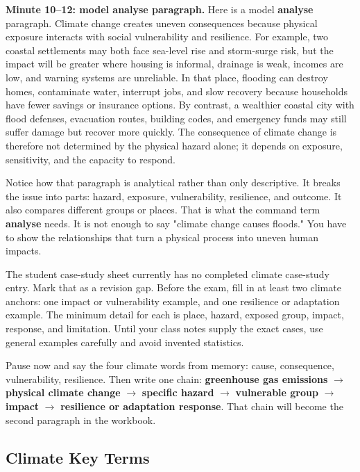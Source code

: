 \documentclass[11pt,a4paper]{article}
\newcommand{\term}[1]{\textcolor{HeadingBlue}{\textbf{#1}}}
\newcommand{\exam}[1]{\textcolor{AccentTeal}{\textbf{#1}}}
\begin{document}
\textbf{Minute 10--12: model analyse paragraph.}
Here is a model \exam{analyse} paragraph. Climate change creates uneven
consequences because physical exposure interacts with social vulnerability and
resilience. For example, two coastal settlements may both face sea-level rise
and storm-surge risk, but the impact will be greater where housing is informal,
drainage is weak, incomes are low, and warning systems are unreliable. In that
place, flooding can destroy homes, contaminate water, interrupt jobs, and slow
recovery because households have fewer savings or insurance options. By
contrast, a wealthier coastal city with flood defenses, evacuation routes,
building codes, and emergency funds may still suffer damage but recover more
quickly. The consequence of climate change is therefore not determined by the
physical hazard alone; it depends on exposure, sensitivity, and the capacity to
respond.

Notice how that paragraph is analytical rather than only descriptive. It breaks
the issue into parts: hazard, exposure, vulnerability, resilience, and outcome.
It also compares different groups or places. That is what the command term
\exam{analyse} needs. It is not enough to say "climate change causes floods."
You have to show the relationships that turn a physical process into uneven
human impacts.

The student case-study sheet currently has no completed climate case-study
entry. Mark that as a revision gap. Before the exam, fill in at least two
climate anchors: one impact or vulnerability example, and one resilience or
adaptation example. The minimum detail for each is place, hazard, exposed group,
impact, response, and limitation. Until your class notes supply the exact cases,
use general examples carefully and avoid invented statistics.

Pause now and say the four climate words from memory: cause, consequence,
vulnerability, resilience. Then write one chain:
\term{greenhouse gas emissions} $\rightarrow$ \term{physical climate change}
$\rightarrow$ \term{specific hazard} $\rightarrow$ \term{vulnerable group}
$\rightarrow$ \term{impact} $\rightarrow$ \term{resilience or adaptation
response}. That chain will become the second paragraph in the workbook.

\subsection{Climate Key Terms}
\end{document}

